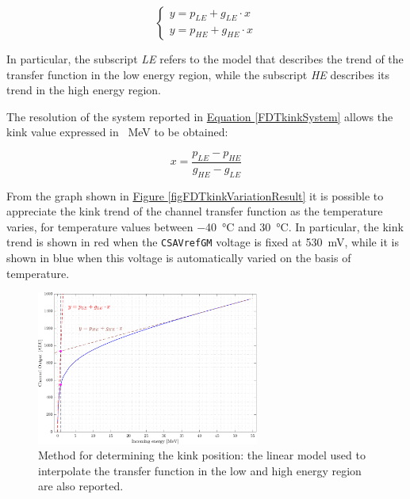\begin{equation}
    \begin{cases}
        y = p_{LE} + g_{LE} \cdot x \\
        y = p_{HE} + g_{HE} \cdot x
    \end{cases}
    \label{FDTkinkSystem}
\end{equation}

\noindent
In particular, the subscript \textit{LE} refers to the model that describes the trend of the transfer function in the low energy region, while the subscript \textit{HE} describes its trend in the high energy region. 

\par
The resolution of the system reported in \hyperref[FDTkinkSystem]{Equation \ref{FDTkinkSystem}} allows the kink value expressed in \SI{}{\mega\electronvolt} to be obtained:

\begin{equation}
    x = \frac{p_{LE} - p_{HE}}{g_{HE} - g_{LE}}
\end{equation}

\par
From the graph shown in \hyperref[figFDTkinkVariationResult]{Figure \ref{figFDTkinkVariationResult}} it is possible to appreciate the kink trend of the channel transfer function as the temperature varies, for temperature values between \SI{-40}{\celsius} and \SI{30}{\celsius}. In particular, the kink trend is shown in red when the \texttt{CSAVrefGM} voltage is fixed at \SI{530}{\milli\volt}, while it is shown in blue when this voltage is automatically varied on the basis of temperature.

\begin{figure}[h!]
    \centering
    \includegraphics[width=0.65\textwidth]{Images/chap1/results/FDT/fdt_calcolo_kink.pdf}
    \caption{Method for determining the kink position: the linear model used to interpolate the transfer function in the low and high energy region are also reported.}
    \label{figFDTkinkVariation}
\end{figure}

